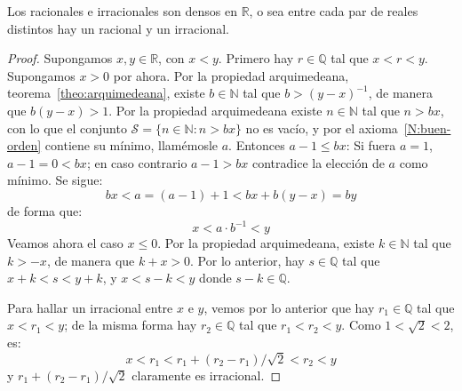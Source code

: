   \begin{theorem}
    \label{theo:Q-dense}
    Los racionales e irracionales son densos en \(\mathbb{R}\),
    o sea entre cada par de reales distintos hay un racional y un irracional.
  \end{theorem}
  \begin{proof}
    Supongamos \(x, y \in \mathbb{R}\),
    con \(x < y\).
    Primero hay \(r \in \mathbb{Q}\) tal que \(x < r < y\).
    Supongamos \(x > 0\) por ahora.
    Por la propiedad arquimedeana,%
    teorema~\ref{theo:arquimedeana},
    existe \(b \in \mathbb{N}\) tal que \(b > (y - x)^{-1}\),
    de manera que \(b (y - x) > 1\).
    Por la propiedad arquimedeana existe \(n \in \mathbb{N}\)
    tal que \(n > b x\),
    con lo que el conjunto
      \(\mathcal{S} = \{n \in \mathbb{N} \colon n > b x\}\)
    no es vacío,
    y por el axioma~\ref{N:buen-orden} contiene su mínimo,%
    llamémosle \(a\).
    Entonces \(a - 1 \le b x\):
    Si fuera \(a = 1\),
    \(a - 1 = 0 < b x\);
    en caso contrario \(a - 1 > b x\)
    contradice la elección de \(a\) como mínimo.
    Se sigue:
    \begin{equation*}
      b x
	< a
	= (a - 1) + 1
	< b x + b (y - x)
	= b y
    \end{equation*}
    de forma que:
    \begin{equation*}
      x < a \cdot b^{-1} < y
    \end{equation*}
    Veamos ahora el caso \(x \le 0\).
    Por la propiedad arquimedeana,
    existe \(k \in \mathbb{N}\) tal que \(k > -x\),
    de manera que \(k + x > 0\).
    Por lo anterior,
    hay \(s \in \mathbb{Q}\) tal que \(x + k < s < y + k\),
    y \(x < s - k < y\)
    donde \(s - k \in \mathbb{Q}\).

    Para hallar un irracional entre \(x\) e \(y\),
    vemos por lo anterior que hay \(r_1 \in \mathbb{Q}\)
    tal que \(x < r_1 < y\);
    de la misma forma hay \(r_2 \in \mathbb{Q}\)
    tal que \(r_1 < r_2 < y\).
    Como \(1 < \sqrt{2} < 2\),
    es:
    \begin{equation*}
      x < r_1 < r_1 + (r_2 - r_1) / \sqrt{2} < r_2 < y
    \end{equation*}
    y \(r_1 + (r_2 - r_1) / \sqrt{2}\) claramente es irracional.
  \end{proof}


